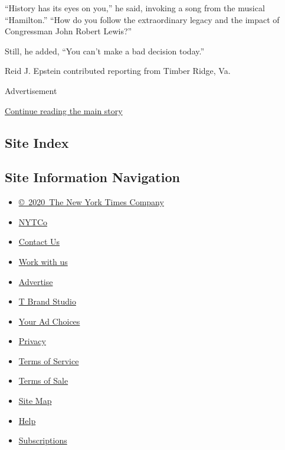 ``History has its eyes on you,'' he said, invoking a song from the
musical ``Hamilton.'' ``How do you follow the extraordinary legacy and
the impact of Congressman John Robert Lewis?''

Still, he added, ``You can't make a bad decision today.''

Reid J. Epstein contributed reporting from Timber Ridge, Va.

Advertisement

\protect\hyperlink{after-bottom}{Continue reading the main story}

\hypertarget{site-index}{%
\subsection{Site Index}\label{site-index}}

\hypertarget{site-information-navigation}{%
\subsection{Site Information
Navigation}\label{site-information-navigation}}

\begin{itemize}
\tightlist
\item
  \href{https://help.nytimes.com/hc/en-us/articles/115014792127-Copyright-notice}{©~2020~The
  New York Times Company}
\end{itemize}

\begin{itemize}
\tightlist
\item
  \href{https://www.nytco.com/}{NYTCo}
\item
  \href{https://help.nytimes.com/hc/en-us/articles/115015385887-Contact-Us}{Contact
  Us}
\item
  \href{https://www.nytco.com/careers/}{Work with us}
\item
  \href{https://nytmediakit.com/}{Advertise}
\item
  \href{http://www.tbrandstudio.com/}{T Brand Studio}
\item
  \href{https://www.nytimes.com/privacy/cookie-policy\#how-do-i-manage-trackers}{Your
  Ad Choices}
\item
  \href{https://www.nytimes.com/privacy}{Privacy}
\item
  \href{https://help.nytimes.com/hc/en-us/articles/115014893428-Terms-of-service}{Terms
  of Service}
\item
  \href{https://help.nytimes.com/hc/en-us/articles/115014893968-Terms-of-sale}{Terms
  of Sale}
\item
  \href{https://spiderbites.nytimes.com}{Site Map}
\item
  \href{https://help.nytimes.com/hc/en-us}{Help}
\item
  \href{https://www.nytimes.com/subscription?campaignId=37WXW}{Subscriptions}
\end{itemize}
